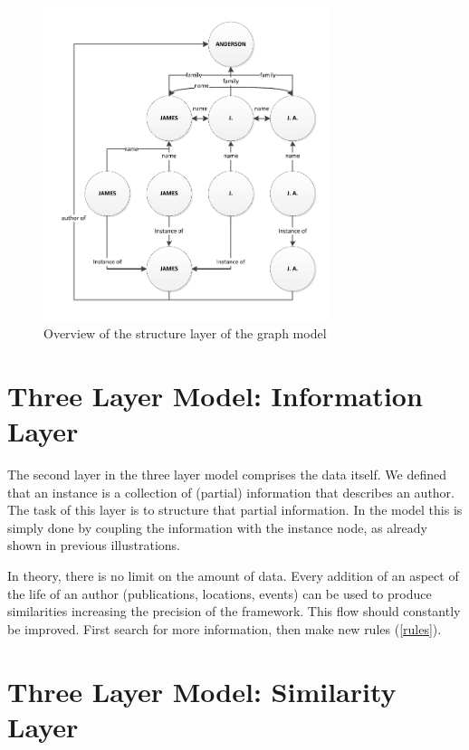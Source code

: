 \begin{figure}[htb]
	\centering
		\includegraphics[width=0.75\textwidth]{fig/graphstructureoverview}
	\caption{Overview of the structure layer of the graph model}
	\label{fig:graphstructureoverview}
\end{figure}

\section{Three Layer Model: Information Layer}

The second layer in the three layer model comprises the data itself. We defined that an instance is a collection of (partial) information that describes an author. The task of this layer is to structure that partial information. In the model this is simply done by coupling the information with the instance node, as already shown in previous illustrations.

In theory, there is no limit on the amount of data. Every addition of an aspect of the life of an author (publications, locations, events) can be used to produce similarities increasing the precision of the framework. This flow should constantly be improved. First search for more information, then make new rules (\autoref{rules}).

\section{Three Layer Model: Similarity Layer}

